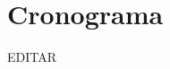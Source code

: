\documentclass[preprint,12pt]{elsarticle}
\begin{document}

\section{Cronograma}

EDITAR\\




	
	\newpage
	
		 
	
	
\end{document}
